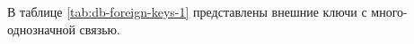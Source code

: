 
\clearpage

В таблице \ref{tab:db-foreign-keys-1} представлены внешние ключи с много-однозначной связью.

